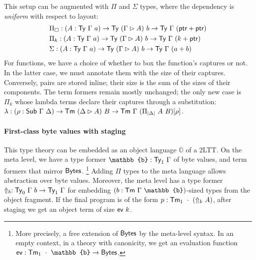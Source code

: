 This setup can be augmented with $\Pi$ and $\Sigma$ types, where the dependency
is \emph{uniform} with respect to layout:
\begin{align*}
&\Pi_\square : (A : \Ty\ \Gamma\ a) \to \Ty\ (\Gamma \rhd A)\ b \to \Ty\ \Gamma\ (\ptr + \ptr) \\
&\Pi_k : (A : \Ty\ \Gamma\ a) \to \Ty\ (\Gamma \rhd A)\ b \to \Ty\ \Gamma\ (k + \ptr) \\
&\Sigma : (A : \Ty\ \Gamma\ a) \to \Ty\ (\Gamma \rhd A)\ b \to \Ty\ \Gamma\ (a + b)
\end{align*}
For functions, we have a choice of whether to box the function's captures or
not. In the latter case, we must annotate them with the size of their captures.
Conversely, pairs are stored inline; their size is the sum of the sizes of their
components. The term formers remain mostly unchanged; the only new case is
$\Pi_k$ whose lambda terms declare their captures through a substitution:
$\lambda : (\rho : \syn{Sub}\ \Gamma\ \Delta) \to \Tm\ (\Delta \rhd A)\ B \to \Tm\ \Gamma\ (\Pi_{|\Delta|}\ A\ B)[\rho]$.

\paragraph{First-class byte values with staging}\label{layouts-staging}

This type theory can be embedded as an object language $\mathbb{O}$ of a 2LTT.
On the meta level, we have a type former $\mathbb{b} : \Ty_1\ \Gamma$ of byte
values, and term formers that mirror $\textsf{Bytes}$.%
\footnote{More precisely, a free extension \cite{Yallop2018-zw} of $\textsf{Bytes}$ by the
meta-level syntax. In an empty context, in a theory with canonicity, we get an
evaluation function $\syn{ev} : \Tm_1\ \cdot\ \mathbb{b} \to \Bytes$.}
Adding $\Pi$ types to the meta language
allows abstraction over byte values. Moreover, the meta level has a type former
$\Uparrow_b : \Ty_0\ \Gamma\ b \to \Ty_1\ \Gamma$ for embedding $(b : \Tm\ \Gamma\ \mathbb{b})$-sized types from
the object fragment. If the final program is of the form $p :
\textsf{Tm}_1\ \cdot\ (\Uparrow_k A)$, after staging we get an object term of size $\textsf{ev}\ k$.





